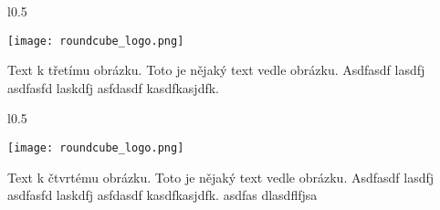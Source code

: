 \documentclass[12pt,a4paper,twoside]{book}
\begin{document}
\begin{wrapfigure}{l}{0.5\textwidth}
  \vspace{-20pt}
  \begin{center}
    \texttt{[image: roundcube\_logo.png]}
  \end{center}
  \vspace{-20pt}
\end{wrapfigure}

Text k třetímu obrázku. Toto je nějaký text vedle obrázku. Asdfasdf lasdfj asdfasfd laskdfj asfdasdf kasdfkasjdfk.
\newline

\begin{wrapfigure}{l}{0.5\textwidth}
  \vspace{-20pt}
  \begin{center}
    \texttt{[image: roundcube\_logo.png]}
  \end{center}
  \vspace{-20pt}
\end{wrapfigure}

Text k čtvrtému obrázku. Toto je nějaký text vedle obrázku. Asdfasdf lasdfj asdfasfd laskdfj asfdasdf kasdfkasjdfk.
\newline
asdfas dlasdflfjsa 
\end{document}
